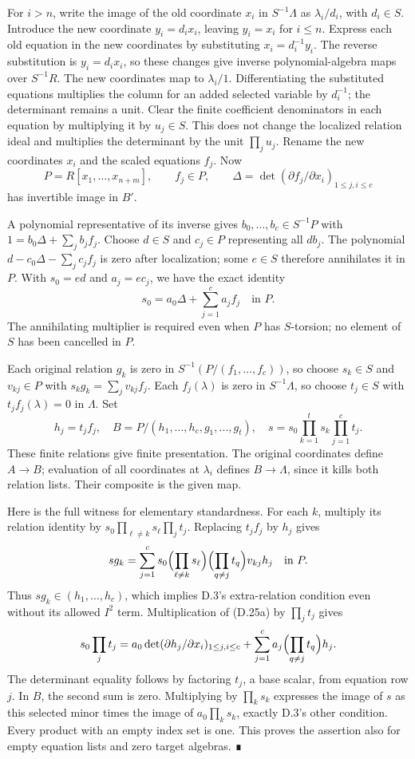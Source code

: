 \documentclass[11pt,a4paper,openany]{report}
\begin{document}
For \(i>n\), write the image of the old coordinate \(x_i\) in \(S^{-1}\Lambda\) as \(\lambda_i/d_i\), with \(d_i\in S\). Introduce the new coordinate \(y_i=d_ix_i\), leaving \(y_i=x_i\) for \(i\le n\). Express each old equation in the new coordinates by substituting \(x_i=d_i^{-1}y_i\). The reverse substitution is \(y_i=d_ix_i\), so these changes give inverse polynomial-algebra maps over \(S^{-1}R\). The new coordinates map to \(\lambda_i/1\). Differentiating the substituted equations multiplies the column for an added selected variable by \(d_i^{-1}\); the determinant remains a unit. Clear the finite coefficient denominators in each equation by multiplying it by \(u_j\in S\). This does not change the localized relation ideal and multiplies the determinant by the unit \(\prod_j u_j\). Rename the new coordinates \(x_i\) and the scaled equations \(f_j\). Now \[
P=R[x_1,\ldots,x_{n+m}],\qquad f_j\in P,\qquad
\Delta=\det(\partial f_j/\partial x_i)_{1\le j,i\le c}
\] has invertible image in \(B'\).

A polynomial representative of its inverse gives \(b_0,\ldots,b_c\in S^{-1}P\) with \(1=b_0\Delta+\sum_j b_jf_j\). Choose \(d\in S\) and \(c_j\in P\) representing all \(db_j\). The polynomial \(d-c_0\Delta-\sum_jc_jf_j\) is zero after localization; some \(e\in S\) therefore annihilates it in \(P\). With \(s_0=ed\) and \(a_j=ec_j\), we have the exact identity \[
s_0=a_0\Delta+\sum_{j=1}^c a_jf_j\quad\text{in }P.
\tag{D.25a}
\] The annihilating multiplier is required even when \(P\) has \(S\)-torsion; no element of \(S\) has been cancelled in \(P\).

Each original relation \(g_k\) is zero in \(S^{-1}(P/(f_1,\ldots,f_c))\), so choose \(s_k\in S\) and \(v_{kj}\in P\) with \(s_kg_k=\sum_jv_{kj}f_j\). Each \(f_j(\lambda)\) is zero in \(S^{-1}\Lambda\), so choose \(t_j\in S\) with \(t_jf_j(\lambda)=0\) in \(\Lambda\). Set \[
h_j=t_jf_j,\quad
B=P/(h_1,\ldots,h_c,g_1,\ldots,g_t),\quad
s=s_0\prod_{k=1}^t s_k\prod_{j=1}^c t_j.
\] These finite relations give finite presentation. The original coordinates define \(A\to B\); evaluation of all coordinates at \(\lambda_i\) defines \(B\to\Lambda\), since it kills both relation lists. Their composite is the given map.

Here is the full witness for elementary standardness. For each \(k\), multiply its relation identity by \(s_0\prod_{\ell\ne k}s_\ell\prod_jt_j\). Replacing \(t_jf_j\) by \(h_j\) gives \[
sg_k=\sum_{j=1}^c
s_0\Bigl(\prod_{\ell\ne k}s_\ell\Bigr)
\Bigl(\prod_{q\ne j}t_q\Bigr)v_{kj}h_j
\quad\text{in }P.
\] Thus \(sg_k\in(h_1,\ldots,h_c)\), which implies D.3's extra-relation condition even without its allowed \(I^2\) term. Multiplication of (D.25a) by \(\prod_jt_j\) gives \[
s_0\prod_jt_j
=a_0\det(\partial h_j/\partial x_i)_{1\le j,i\le c}
+\sum_{j=1}^c a_j\Bigl(\prod_{q\ne j}t_q\Bigr)h_j.
\] The determinant equality follows by factoring \(t_j\), a base scalar, from equation row \(j\). In \(B\), the second sum is zero. Multiplying by \(\prod_ks_k\) expresses the image of \(s\) as this selected minor times the image of \(a_0\prod_ks_k\), exactly D.3's other condition. Every product with an empty index set is one. This proves the assertion also for empty equation lists and zero target algebras. ∎
\end{document}
